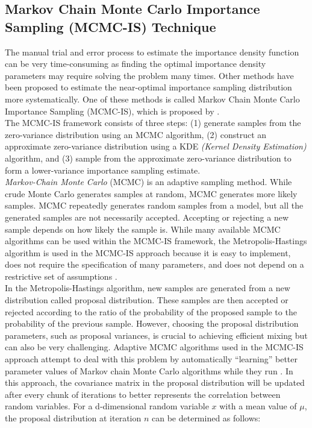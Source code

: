     \subsection{Markov Chain Monte Carlo Importance Sampling (MCMC-IS) Technique} 
        The manual trial and error process to estimate the importance density function can be very time-consuming as finding the optimal importance density parameters may require solving the problem many times. Other methods have been proposed to estimate the near-optimal importance sampling distribution more systematically. One of these methods is called Markov Chain Monte Carlo Importance Sampling (MCMC-IS), which is proposed by \cite{parpas_importance_2015}.\\
        The MCMC-IS framework consists of three steps: (1) generate samples from the zero-variance distribution using an MCMC algorithm, (2) construct an approximate zero-variance distribution using a KDE \textit{(Kernel Density Estimation)} algorithm, and (3) sample from the approximate zero-variance distribution to form a lower-variance importance sampling estimate.\\
        \textit{Markov-Chain Monte Carlo} (MCMC) is an adaptive sampling method. While crude Monte Carlo generates samples at random, MCMC generates more likely samples. MCMC repeatedly generates random samples from a model, but all the generated samples are not necessarily accepted. Accepting or rejecting a new sample depends on how likely the sample is. While many available MCMC algorithms \cite{gelman_handbook_2010} can be used within the MCMC-IS framework, the Metropolis-Hastings algorithm is used in the MCMC-IS approach because it is easy to implement, does not require the specification of many parameters, and does not depend on a restrictive set of assumptions \cite{parpas_importance_2015}.\\
        In the Metropolis-Hastings algorithm, new samples are generated from a new distribution called proposal distribution. These samples are then accepted or rejected according to the ratio of the probability of the proposed sample to the probability of the previous sample. However, choosing the proposal distribution parameters, such as proposal variances, is crucial to achieving efficient mixing but can also be very challenging. Adaptive MCMC algorithms used in the MCMC-IS approach attempt to deal with this problem by automatically “learning” better parameter values of Markov chain Monte Carlo algorithms while they run \cite{haario_adaptive_2001}. In this approach, the covariance matrix in the proposal distribution will be updated after every chunk of iterations to better represents the correlation between random variables. For a d-dimensional random variable $x$ with a mean value of $\mu$, the proposal distribution at iteration $n$ can be determined as follows:

